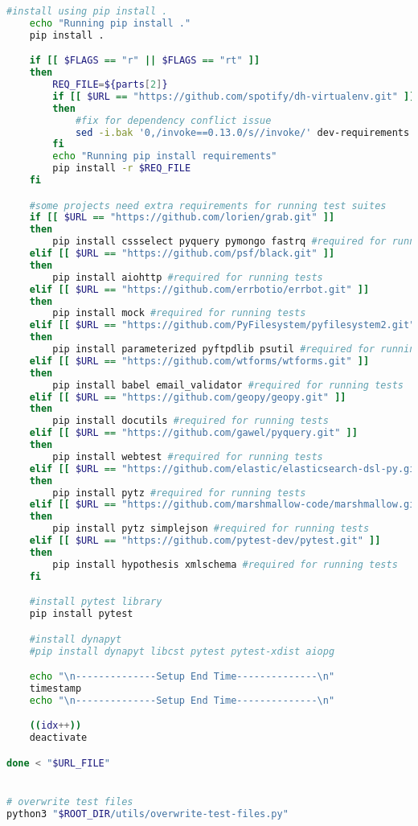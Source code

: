 \begin{lstlisting}[caption=install-all-projects.sh,label=code:install-all-projects.sh,language=Bash]
    #install using pip install . 
    echo "Running pip install ."
    pip install .

    if [[ $FLAGS == "r" || $FLAGS == "rt" ]]
    then
        REQ_FILE=${parts[2]}
        if [[ $URL == "https://github.com/spotify/dh-virtualenv.git" ]]
        then
            #fix for dependency conflict issue
            sed -i.bak '0,/invoke==0.13.0/s//invoke/' dev-requirements.txt
        fi
        echo "Running pip install requirements"
        pip install -r $REQ_FILE
    fi

    #some projects need extra requirements for running test suites
    if [[ $URL == "https://github.com/lorien/grab.git" ]]
    then
        pip install cssselect pyquery pymongo fastrq #required for running tests
    elif [[ $URL == "https://github.com/psf/black.git" ]]
    then
        pip install aiohttp #required for running tests
    elif [[ $URL == "https://github.com/errbotio/errbot.git" ]]
    then
        pip install mock #required for running tests
    elif [[ $URL == "https://github.com/PyFilesystem/pyfilesystem2.git" ]]
    then
        pip install parameterized pyftpdlib psutil #required for running tests
    elif [[ $URL == "https://github.com/wtforms/wtforms.git" ]]
    then
        pip install babel email_validator #required for running tests
    elif [[ $URL == "https://github.com/geopy/geopy.git" ]]
    then
        pip install docutils #required for running tests
    elif [[ $URL == "https://github.com/gawel/pyquery.git" ]]
    then
        pip install webtest #required for running tests
    elif [[ $URL == "https://github.com/elastic/elasticsearch-dsl-py.git" ]]
    then
        pip install pytz #required for running tests
    elif [[ $URL == "https://github.com/marshmallow-code/marshmallow.git" ]]
    then
        pip install pytz simplejson #required for running tests
    elif [[ $URL == "https://github.com/pytest-dev/pytest.git" ]]
    then
        pip install hypothesis xmlschema #required for running tests
    fi

    #install pytest library
    pip install pytest

    #install dynapyt
    #pip install dynapyt libcst pytest pytest-xdist aiopg

    echo "\n--------------Setup End Time--------------\n"
    timestamp
    echo "\n--------------Setup End Time--------------\n"

    ((idx++))
    deactivate

done < "$URL_FILE"


# overwrite test files
python3 "$ROOT_DIR/utils/overwrite-test-files.py"
\end{lstlisting}

